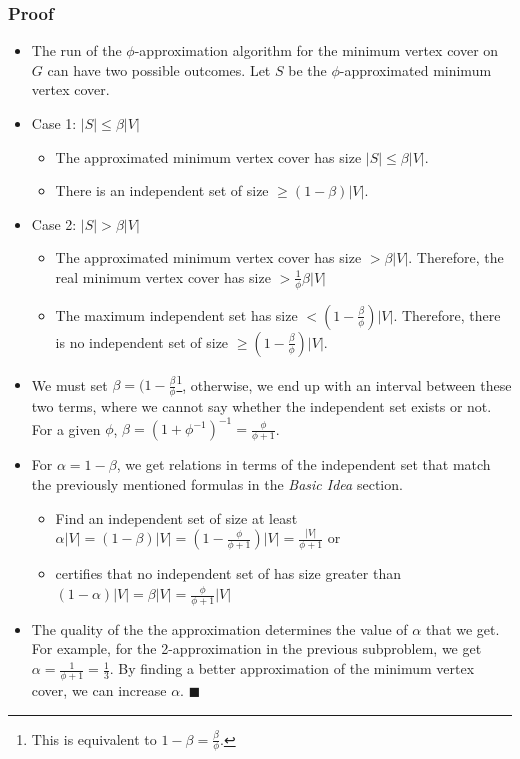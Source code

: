 \documentclass[12pt]{article}
\begin{document}
\subsubsection*{Proof}
\begin{itemize}
	\item The run of the $\phi$-approximation algorithm for the minimum vertex cover on $G$ can have two possible outcomes. Let $S$ be the $\phi$-approximated minimum vertex cover.
	\item Case 1: $|S| \leq \beta |V|$
	\begin{itemize}
		\item The approximated minimum vertex cover has size $|S| \leq \beta |V|$.
		\item There is an independent set of size $\geq (1-\beta) |V|$.
	\end{itemize}
	\item Case 2: $|S| > \beta |V|$
	\begin{itemize}
		\item The approximated minimum vertex cover has size $> \beta |V|$. Therefore, the real minimum vertex cover has size $> \frac{1}{\phi} \beta |V|$
		\item The maximum independent set has size $< (1 - \frac{\beta}{\phi}) |V|$. Therefore, there is no independent set of size $\geq (1 - \frac{\beta}{\phi}) |V|$.
	\end{itemize}
	\item We must set $\beta = (1 - \frac{\beta}{\phi}$\footnote{This is equivalent to $1-\beta = \frac{\beta}{\phi}$.}, otherwise, we end up with an interval between these two terms, where we cannot say whether the independent set exists or not. For a given $\phi$, $\beta = (1+\phi^{-1})^{-1} = \frac{\phi}{\phi+1}$.
	\item For $\alpha = 1-\beta$, we get relations in terms of the independent set that match the previously mentioned formulas in the \emph{Basic Idea} section.
	\begin{itemize}
		\item Find an independent set of size at least $\alpha |V| = (1-\beta) |V| = (1-\frac{\phi}{\phi + 1}) |V| = \frac{|V|}{\phi + 1}$ or
		\item certifies that no independent set of has size greater than $(1-\alpha) |V| = \beta |V| = \frac{\phi}{\phi + 1} |V|$
	\end{itemize}
	\item The quality of the the approximation determines the value of $\alpha$ that we get. For example, for the 2-approximation in the previous subproblem, we get $\alpha = \frac{1}{\phi + 1} = \frac{1}{3}$. By finding a better approximation of the minimum vertex cover, we can increase $\alpha$. \hfill $\blacksquare$
\end{itemize}
\end{document}
